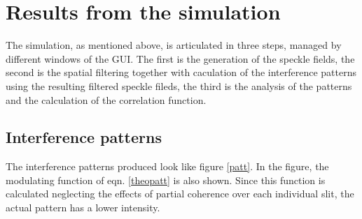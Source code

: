\section{Results from the simulation}


The simulation, as mentioned above, is articulated in three steps, managed by different windows of the GUI. The first is the generation of the speckle fields, 
the second is the spatial filtering together with caculation of the interference patterns using the resulting filtered speckle fileds, the third is the analysis of 
the patterns and the calculation of the correlation function.



\subsection{Interference patterns}

The interference patterns produced look like figure \ref{patt}. In the figure, the modulating function of eqn. \eqref{theopatt} is also shown. Since this 
function is calculated neglecting the effects of partial coherence over each individual slit, the actual pattern has a lower intensity. \\

